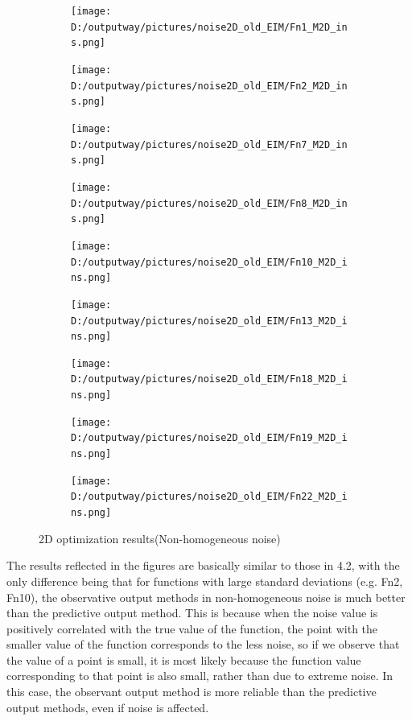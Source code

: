 \documentclass{article}
\begin{document}
\begin{figure}[H]
    \centering
    \begin{subfigure}[t]{.32\linewidth}
        \centering
        \texttt{[image: D:/outputway/pictures/noise2D\_old\_EIM/Fn1\_M2D\_ins.png]}
    \end{subfigure}
    \begin{subfigure}[t]{.32\linewidth}
        \centering
        \texttt{[image: D:/outputway/pictures/noise2D\_old\_EIM/Fn2\_M2D\_ins.png]}
    \end{subfigure}
    \begin{subfigure}[t]{.32\linewidth}
        \centering
        \texttt{[image: D:/outputway/pictures/noise2D\_old\_EIM/Fn7\_M2D\_ins.png]}
    \end{subfigure}
    \begin{subfigure}[t]{.32\linewidth}
        \centering
        \texttt{[image: D:/outputway/pictures/noise2D\_old\_EIM/Fn8\_M2D\_ins.png]}
    \end{subfigure}
    \begin{subfigure}[t]{.32\linewidth}
        \centering
        \texttt{[image: D:/outputway/pictures/noise2D\_old\_EIM/Fn10\_M2D\_ins.png]}
    \end{subfigure}
    \begin{subfigure}[t]{.32\linewidth}
        \centering
        \texttt{[image: D:/outputway/pictures/noise2D\_old\_EIM/Fn13\_M2D\_ins.png]}
    \end{subfigure}
    \begin{subfigure}[t]{.32\linewidth}
        \centering
        \texttt{[image: D:/outputway/pictures/noise2D\_old\_EIM/Fn18\_M2D\_ins.png]}
    \end{subfigure}
    \begin{subfigure}[t]{.32\linewidth}
        \centering
        \texttt{[image: D:/outputway/pictures/noise2D\_old\_EIM/Fn19\_M2D\_ins.png]}
    \end{subfigure}
    \begin{subfigure}[t]{.32\linewidth}
        \centering
        \texttt{[image: D:/outputway/pictures/noise2D\_old\_EIM/Fn22\_M2D\_ins.png]}
    \end{subfigure}
    \caption{2D optimization results(Non-homogeneous noise)}
    \label{Fig5}
\end{figure}
The results reflected in the figures are basically similar to those in 4.2, with the only difference being that for functions with large standard deviations (e.g. Fn2, Fn10), the observative output methods in non-homogeneous noise is much better than the predictive output method. This is because when the noise value is positively correlated with the true value of the function, the point with the smaller value of the function corresponds to the less noise, so if we observe that the value of a point is small, it is most likely because the function value corresponding to that point is also small, rather than due to extreme noise. In this case, the observant output method is more reliable than the predictive output methods, even if noise is affected.
\end{document}
